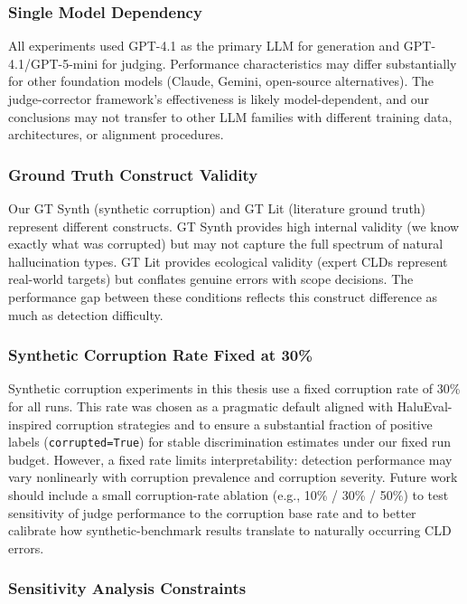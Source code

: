 \subsubsection{Single Model Dependency}

All experiments used GPT-4.1 as the primary LLM for generation and GPT-4.1/GPT-5-mini for judging. Performance characteristics may differ substantially for other foundation models (Claude, Gemini, open-source alternatives). The judge-corrector framework's effectiveness is likely model-dependent, and our conclusions may not transfer to other LLM families with different training data, architectures, or alignment procedures.

\subsubsection{Ground Truth Construct Validity}

Our GT Synth (synthetic corruption) and GT Lit (literature ground truth) represent different constructs. GT Synth provides high internal validity (we know exactly what was corrupted) but may not capture the full spectrum of natural hallucination types. GT Lit provides ecological validity (expert CLDs represent real-world targets) but conflates genuine errors with scope decisions. The performance gap between these conditions reflects this construct difference as much as detection difficulty.

\subsubsection{Synthetic Corruption Rate Fixed at 30\%}
Synthetic corruption experiments in this thesis use a fixed corruption rate of 30\% for all runs. This rate was chosen as a pragmatic default aligned with HaluEval-inspired corruption strategies and to ensure a substantial fraction of positive labels (\texttt{corrupted=True}) for stable discrimination estimates under our fixed run budget. However, a fixed rate limits interpretability: detection performance may vary nonlinearly with corruption prevalence and corruption severity. Future work should include a small corruption-rate ablation (e.g., 10\% / 30\% / 50\%) to test sensitivity of judge performance to the corruption base rate and to better calibrate how synthetic-benchmark results translate to naturally occurring CLD errors.

\subsubsection{Sensitivity Analysis Constraints}

